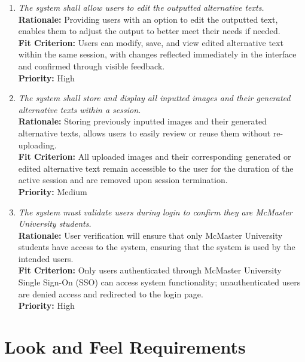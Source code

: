 \documentclass[12pt]{article}
\begin{document}
\begin{enumerate}[label=FR \arabic*., wide=0pt, leftmargin=*]
  \item \emph{The system shall allow users to edit the outputted
    alternative texts.}\\[2mm]
    {\bf Rationale:} Providing users with an option to edit the
    outputted text, enables them to adjust the output to better meet
    their needs if needed.\\
    {\bf Fit Criterion:} Users can modify, save, and view edited alternative text within the same session, with changes reflected immediately in the interface and confirmed through visible feedback.\\
    {\bf Priority:} High
  \item \emph{The system shall store and display all inputted images
    and their generated alternative texts within a session.}\\[2mm]
    {\bf Rationale:} Storing previously inputted images and their
    generated alternative texts, allows users to easily review or
    reuse them without re-uploading. \\
    {\bf Fit Criterion:} All uploaded images and their corresponding generated or edited alternative text remain accessible to the user for the duration of the active session and are removed upon session termination.\\
    {\bf Priority:} Medium
  \item \emph{The system must validate users during login to confirm
    they are McMaster University students.}\\[2mm]
    {\bf Rationale:} User verification will ensure that only McMaster
    University students have access to the system, ensuring that the
    system is used by the intended users.  \\
    {\bf Fit Criterion:} Only users authenticated through McMaster University Single Sign-On (SSO) can access system functionality; unauthenticated users are denied access and redirected to the login page.\\
    {\bf Priority:} High
\end{enumerate}

\section{Look and Feel Requirements}
\end{document}
